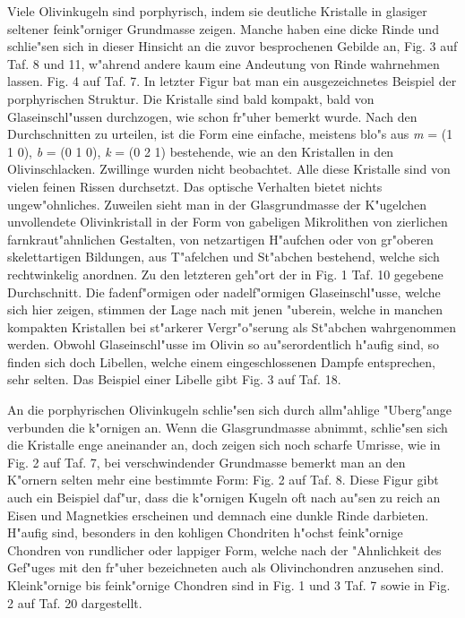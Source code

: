 \documentclass[a4paper, 11pt, oneside, polutonikogreek, german]{article}
\begin{document}
Viele Olivinkugeln sind porphyrisch, indem sie deutliche Kristalle in glasiger seltener feink"orniger Grundmasse zeigen. Manche haben eine dicke Rinde und schlie"sen sich in dieser Hinsicht an die zuvor besprochenen Gebilde an, Fig. 3 auf Taf. 8 und 11, w"ahrend andere kaum eine Andeutung von Rinde wahrnehmen lassen. Fig. 4 auf Taf. 7. In letzter Figur bat man ein ausgezeichnetes Beispiel der porphyrischen Struktur. Die Kristalle sind bald kompakt, bald von Glaseinschl"ussen durchzogen, wie schon fr"uher bemerkt wurde. Nach den Durchschnitten zu urteilen, ist die Form eine einfache, meistens blo"s aus \emph{m} = (1 1 0), \emph{b} = (0 1 0), \emph{k} = (0 2 1) bestehende, wie an den Kristallen in den Olivinschlacken. Zwillinge wurden nicht beobachtet. Alle diese Kristalle sind von vielen feinen Rissen durchsetzt. Das optische Verhalten bietet nichts ungew"ohnliches. Zuweilen sieht man in der Glasgrundmasse der K"ugelchen unvollendete Olivinkristall in der Form von gabeligen Mikrolithen von zierlichen farnkraut"ahnlichen Gestalten, von netzartigen H"aufchen oder von gr"oberen skelettartigen Bildungen, aus T"afelchen und St"abchen bestehend, welche sich rechtwinkelig anordnen. Zu den letzteren geh"ort der in Fig. 1 Taf. 10 gegebene Durchschnitt. Die fadenf"ormigen oder nadelf"ormigen Glaseinschl"usse, welche sich hier zeigen, stimmen der Lage nach mit jenen "uberein, welche in manchen kompakten Kristallen bei st"arkerer Vergr"o"serung als St"abchen wahrgenommen werden. Obwohl Glaseinschl"usse im Olivin so au"serordentlich h"aufig sind, so finden sich doch Libellen, welche einem eingeschlossenen Dampfe entsprechen, sehr selten. Das Beispiel einer Libelle gibt Fig. 3 auf Taf. 18.

An die porphyrischen Olivinkugeln schlie"sen sich durch allm"ahlige "Uberg"ange verbunden die k"ornigen an. Wenn die Glasgrundmasse abnimmt, schlie"sen sich die Kristalle enge aneinander an, doch zeigen sich noch scharfe Umrisse, wie in Fig. 2 auf Taf. 7, bei verschwindender Grundmasse bemerkt man an den K"ornern selten mehr eine bestimmte Form: Fig. 2 auf Taf. 8. Diese Figur gibt auch ein Beispiel daf"ur, dass die k"ornigen Kugeln oft nach au"sen zu reich an Eisen und Magnetkies erscheinen und demnach eine dunkle Rinde darbieten. H"aufig sind, besonders in den kohligen Chondriten h"ochst feink"ornige Chondren von rundlicher oder lappiger Form, welche nach der "Ahnlichkeit des Gef"uges mit den fr"uher bezeichneten auch als Olivinchondren anzusehen sind. Kleink"ornige bis feink"ornige Chondren sind in Fig. 1 und 3 Taf. 7 sowie in Fig. 2 auf Taf. 20 dargestellt.
\end{document}
